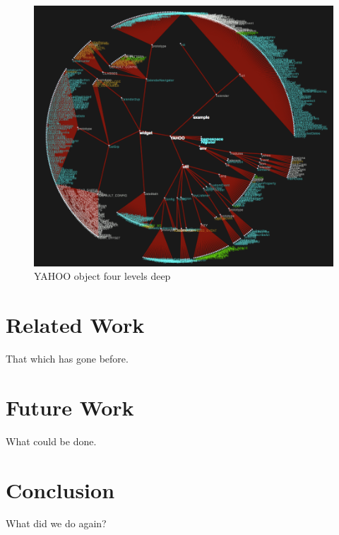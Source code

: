 \documentclass[]{article}
\begin{document}
\begin{figure}[h]
  \begin{center}
    \includegraphics[scale=.2]{yahoo.png}
  \end{center}
  \caption{YAHOO object four levels deep}
  \label{fig:yahoo}
\end{figure}

\section{Related Work}
\label{sec:related}
That which has gone before.

\section{Future Work}
\label{sec:future}
What could be done.

\section{Conclusion}
\label{sec:conclusion}
What did we do again?



\end{document}
